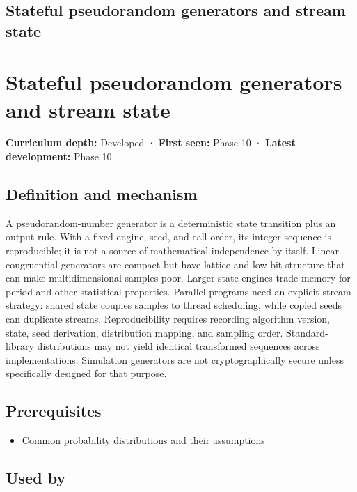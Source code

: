 \hypertarget{appendix-e0f7c7e08f3a}{}
\section*{Stateful pseudorandom generators and stream state}
\chapter{Stateful pseudorandom generators and stream state}\label{appendix-e0f7c7e08f3a-stateful-pseudorandom-generators-and-stream-state}

\textbf{Curriculum depth:} Developed · \textbf{First seen:} Phase 10 · \textbf{Latest development:} Phase 10

\section{Definition and mechanism}\label{appendix-e0f7c7e08f3a-definition-and-mechanism}

A pseudorandom-number generator is a deterministic state transition plus an output rule. With a fixed engine, seed, and call order, its integer sequence is reproducible; it is not a source of mathematical independence by itself. Linear congruential generators are compact but have lattice and low-bit structure that can make multidimensional samples poor. Larger-state engines trade memory for period and other statistical properties. Parallel programs need an explicit stream strategy: shared state couples samples to thread scheduling, while copied seeds can duplicate streams. Reproducibility requires recording algorithm version, state, seed derivation, distribution mapping, and sampling order. Standard-library distributions may not yield identical transformed sequences across implementations. Simulation generators are not cryptographically secure unless specifically designed for that purpose.

\section{Prerequisites}\label{appendix-e0f7c7e08f3a-prerequisites}

\begin{itemize}
\tightlist
\item
  \hyperref[appendix-a2360b435383]{Common probability distributions and their assumptions}
\end{itemize}

\section{Used by}\label{appendix-e0f7c7e08f3a-used-by}

